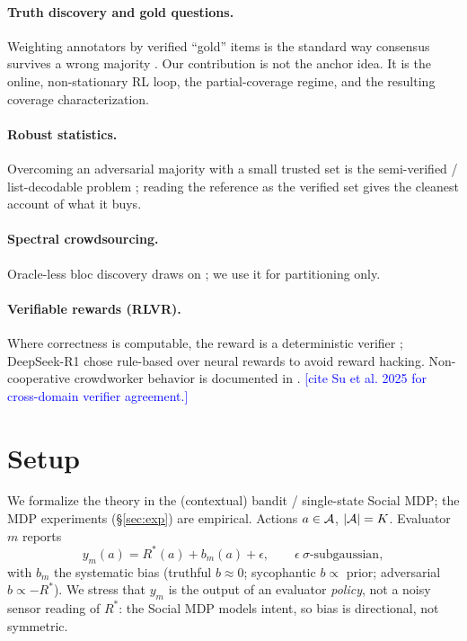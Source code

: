 \documentclass[11pt]{article}
\theoremstyle{definition}\newtheorem{definition}{Definition}
\theoremstyle{definition}\newtheorem{assumption}{Assumption}
\newcommand{\Rstar}{R^{\ast}}\newcommand{\astar}{a^{\ast}}
\newcommand{\note}[1]{\textcolor{blue}{[#1]}}
\begin{document}
\paragraph{Truth discovery and gold questions.} Weighting annotators by verified ``gold'' items is
the standard way consensus survives a wrong majority \citep{dawid1979,li2016survey}. Our
contribution is not the anchor idea. It is the online, non-stationary RL loop, the partial-coverage
regime, and the resulting coverage characterization.

\paragraph{Robust statistics.} Overcoming an adversarial majority with a small trusted set is the
semi-verified / list-decodable problem \citep{charikar2017untrusted,steinhardt2018resilience};
reading the reference as the verified set gives the cleanest account of what it buys.

\paragraph{Spectral crowdsourcing.} Oracle-less bloc discovery draws on
\citep{karger2011iterative,zhang2014spectral,ghosh2011moderators}; we use it for partitioning only.

\paragraph{Verifiable rewards (RLVR).} Where correctness is computable, the reward is a deterministic
verifier \citep{lambert2024tulu,guo2025deepseekr1,shao2024deepseekmath}; DeepSeek-R1 chose rule-based
over neural rewards to avoid reward hacking. Non-cooperative crowdworker behavior is documented in
\citep{downs2010gaming,kazai2011worker}. \note{cite Su et al. 2025 for cross-domain verifier
agreement.}

\section{Setup}\label{sec:setup}
We formalize the theory in the (contextual) bandit / single-state Social MDP; the MDP experiments
(\S\ref{sec:exp}) are empirical. Actions $a\in\mathcal{A}$, $|\mathcal{A}|=K$. Evaluator $m$ reports
\[
y_m(a) = \Rstar(a) + b_m(a) + \epsilon,\qquad \epsilon\ \sigma\text{-subgaussian},
\]
with $b_m$ the systematic bias (truthful $b\!\approx\!0$; sycophantic $b\propto$ prior; adversarial
$b\propto -\Rstar$). We stress that $y_m$ is the output of an evaluator \emph{policy}, not a noisy
sensor reading of $\Rstar$: the Social MDP models intent, so bias is directional, not symmetric.
\end{document}
